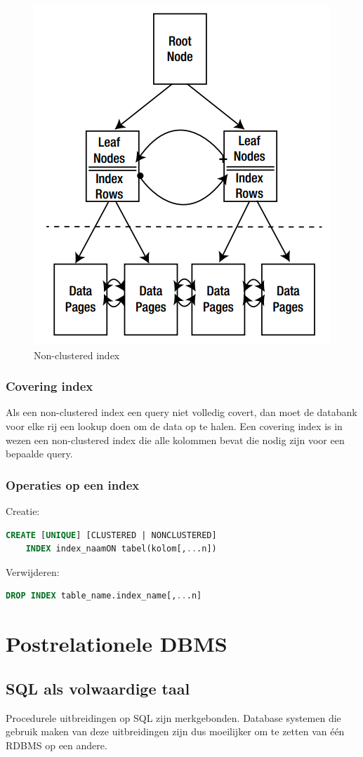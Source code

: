 \documentclass[a4paper,12pt]{article}
\begin{document}
\begin{figure}[H]
\centering
  	\includegraphics[width=.35\linewidth]{img/NonClusteredIndex.png}
  	\caption{Non-clustered index}
  	\label{fig:NonClusteredIndex}
\end{figure}

\subsubsection{Covering index}
Als een non-clustered index een query niet volledig covert, dan moet de databank voor elke rij een lookup doen om de data op te halen.
Een covering index is in wezen een non-clustered index die alle kolommen bevat die nodig zijn voor een bepaalde query.

\subsubsection{Operaties op een index}
Creatie:
\begin{lstlisting}[language=sql, breaklines=true]
CREATE [UNIQUE] [CLUSTERED | NONCLUSTERED]
	INDEX index_naamON tabel(kolom[,...n])
\end{lstlisting}

Verwijderen:
\begin{lstlisting}[language=sql, breaklines=true]
DROP INDEX table_name.index_name[,...n]
\end{lstlisting}

\section{Postrelationele DBMS}
\subsection{SQL als volwaardige taal}
Procedurele uitbreidingen op SQL zijn merkgebonden. Database systemen die gebruik maken van deze uitbreidingen zijn dus moeilijker om te zetten van één RDBMS op een andere.
\end{document}
